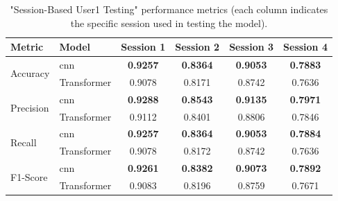 \begin{table}[ht]
    \centering
    \caption{"Session-Based User1 Testing" performance metrics (each column indicates the specific session used in testing the model).}
    \label{table:results_session_based_user1}
    \begin{tabular}{l|lcccc}
        \toprule
        Metric & Model & Session 1 & Session 2 & Session 3 & Session 4 \\
        \midrule
        \multirow{2}{*}{Accuracy} & \acs{cnn} & \textbf{0.9257} & \textbf{0.8364} & \textbf{0.9053} & \textbf{0.7883} \\
        & Transformer & 0.9078 & 0.8171 & 0.8742 & 0.7636 \\
        \midrule
        \multirow{2}{*}{Precision} & \acs{cnn} & \textbf{0.9288} & \textbf{0.8543} & \textbf{0.9135} & \textbf{0.7971} \\
        & Transformer & 0.9112 & 0.8401 & 0.8806 & 0.7846 \\
        \midrule
        \multirow{2}{*}{Recall} & \acs{cnn} & \textbf{0.9257} & \textbf{0.8364} & \textbf{0.9053} & \textbf{0.7884} \\
        & Transformer & 0.9078 & 0.8172 & 0.8742 & 0.7636 \\
        \midrule
        \multirow{2}{*}{F1-Score} & \acs{cnn} & \textbf{0.9261} & \textbf{0.8382} & \textbf{0.9073} & \textbf{0.7892} \\
        & Transformer & 0.9083 & 0.8196 & 0.8759 & 0.7671 \\
        \bottomrule
    \end{tabular}
\end{table}

